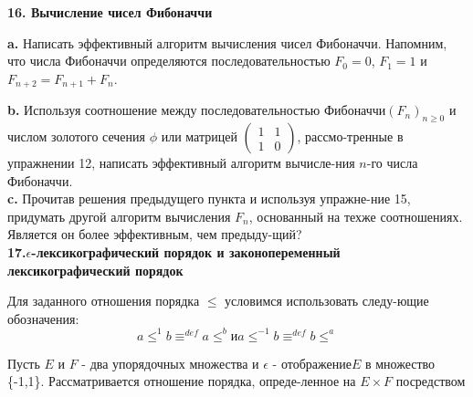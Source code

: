 \noindent\textbf{16. Вычисление чисел Фибоначчи }

\hspace*{15pt}\textbf{ a.} Написать эффективный алгоритм вычисления чисел Фибоначчи. Напомним, что числа Фибоначчи определяются последовательностью $F_{0}=0$, $F_{1}=1$ и $F_{n+2}=F_{n+1}+F_{n}$.

\newpage
\noindent\hspace*{15pt}\textbf{ b.} Используя соотношение между последовательностью Фибоначчи\linebreak ${\left({F_n}\right)}_{n\geq{0}}$ и числом золотого сечения $\phi$ или матрицей $\begin{pmatrix}1 & 1 \\ 1 & 0 \end{pmatrix}$, рассмо-\linebreak тренные в упражнении 12, написать эффективный алгоритм вычисле-\linebreak ния $n$-го числа Фибоначчи.\newline
\\
\hspace*{15pt}\textbf{c.} Прочитав решения предыдущего пункта и используя упражне-\linebreak ние 15, придумать другой алгоритм вычисления $F_{n}$, основанный на тех\linebreak же соотношениях. Является он более эффективным, чем предыду-\linebreak щий?\newline
\\
\noindent\textbf{ 17.$\epsilon$-лексикографический порядок и законопеременный лексикографический порядок}\newline

Для заданного отношения порядка $\leq$ условимся использовать следу-\linebreak ющие обозначения:
\begin{equation*}
a\leq^{1}b \equiv^{def} a\leq^{b}  \text{и}   a\leq^{-1}b \equiv^{def} b\leq^{a}
\end{equation*}

Пусть $E$ и $F$ - два упорядочных множества и $\epsilon$ - отображение\linebreak $E$ в множество      
\{-1,1\}. Рассматривается отношение порядка, опреде-\linebreak ленное на $E\times{F}$ посредством 

